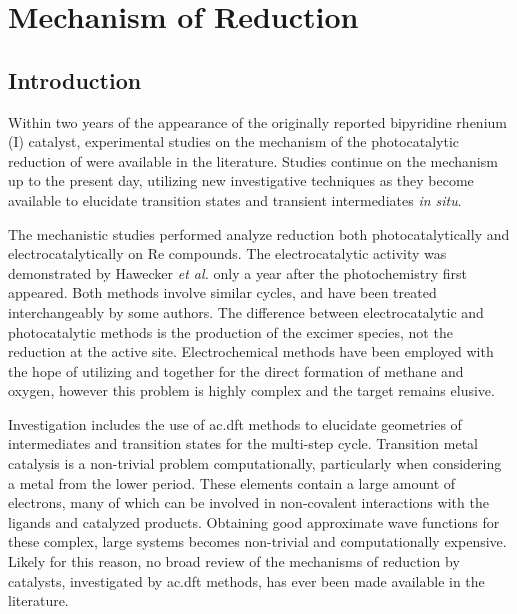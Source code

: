 \chapter{Mechanism of \texorpdfstring{}{CO2} Reduction}\label{chap.mech}

\section{Introduction}

Within two years of the appearance of the originally reported bipyridine rhenium (I) catalyst, experimental studies on the mechanism of the photocatalytic reduction of  were available in the literature\autocite{kutal1985, sullivan1985}. Studies continue on the mechanism up to the present day\autocite{johnson1996, koike2002, gibson2003, hayashi2003, takeda2008, takeda2010, smieja2012, machan2014, kou2014}, utilizing new investigative techniques as they become available to elucidate transition states and transient intermediates \textit{in situ}. 

The mechanistic studies performed analyze  reduction both photocatalytically and electrocatalytically on Re compounds. The electrocatalytic activity was demonstrated by Hawecker \textit{et al.} only a year after the photochemistry first appeared\autocite{hawecker1984}. Both methods involve similar cycles, and have been treated interchangeably by some authors\autocite{hayashi2003, agarwal2012b, keith2013}. The difference between electrocatalytic and photocatalytic methods is the production of the excimer species, not the reduction at the active site. Electrochemical methods have been employed with the hope of utilizing  and  together for the direct formation of methane and oxygen, however this problem is highly complex and the target remains elusive\autocite{roy2010, asatani2014}.

Investigation includes the use of \gls{ac.dft} methods to elucidate geometries of intermediates and transition states for the multi-step cycle. Transition metal catalysis is a non-trivial problem computationally, particularly when considering a metal from the lower period. These elements contain a large amount of electrons, many of which can be involved in non-covalent interactions with the ligands and catalyzed products. Obtaining good approximate wave functions for these complex, large systems becomes non-trivial and computationally expensive. Likely for this reason, no broad review of the mechanisms of  reduction by  catalysts, investigated by \gls{ac.dft} methods, has ever been made available in the literature. 

